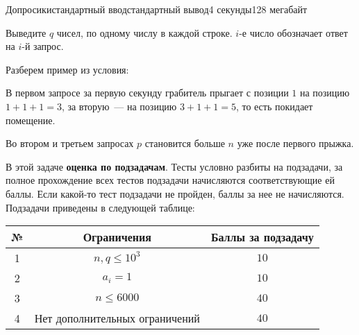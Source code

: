\begin{problem}{Допросики}{стандартный ввод}{стандартный вывод}{4 секунды}{128 мегабайт}
\OutputFile

Выведите $q$ чисел, по одному числу в каждой строке. $i$-е число обозначает ответ на $i$-й запрос.

\Examples

\begin{example}
%
\end{example}

\Notes

Разберем пример из условия:

В первом запросе за первую секунду грабитель прыгает с позиции $1$ на позицию $1 + 1 + 1 = 3$, за вторую~--- на позицию $3 + 1 + 1 = 5$, то есть покидает помещение.

Во втором и третьем запросах $p$ становится больше $n$ уже после первого прыжка.

\Scoring
В этой задаче \textbf{оценка по подзадачам}. Тесты условно разбиты на подзадачи, за полное прохождение всех тестов подзадачи начисляются соответствующие ей баллы. Если какой-то тест подзадачи не пройден, баллы за нее не начисляются. Подзадачи приведены в следующей таблице:

\medskip

\begin{tabular}{| c | c | c |} \hline
	№ & Ограничения & Баллы за подзадачу \\ \hline
	1 & $n, q \le 10^3$ & $10$ \\ \hline
	2 & $a_i = 1$ & $10$ \\ \hline
	3 & $n \le 6000$ & $40$ \\ \hline
	4 & Нет дополнительных ограничений & $40$ \\ \hline
\end{tabular}

\end{problem}

